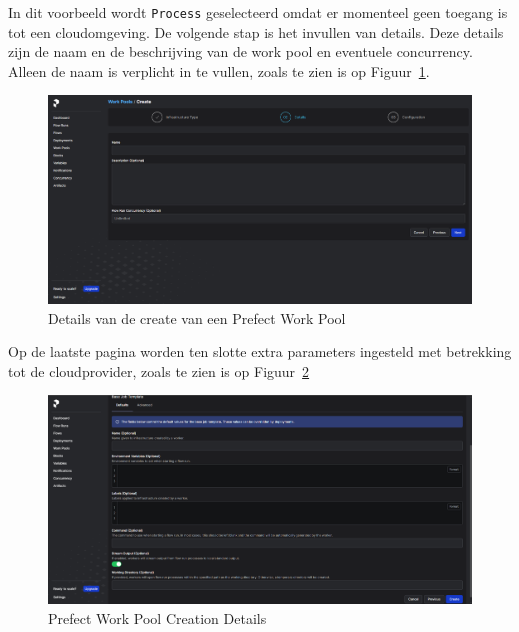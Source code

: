 In dit voorbeeld wordt \texttt{Process} geselecteerd omdat er momenteel geen toegang is tot een cloudomgeving. De volgende stap is het invullen van details. Deze details zijn de naam en de beschrijving van de work pool en eventuele concurrency. Alleen de naam is verplicht in te vullen, zoals te zien is op Figuur~\ref{fig:Prefect_Work_Pools_Create_Details}.

\begin{figure}
    \centering
    \includegraphics[width=0.9\linewidth]{graphics/Prefect_Work_Pools_Create_Details.PNG}
    \caption{Details van de create van een Prefect Work Pool}
    \label{fig:Prefect_Work_Pools_Create_Details}
\end{figure}

Op de laatste pagina worden ten slotte extra parameters ingesteld met betrekking tot de cloudprovider, zoals te zien is op Figuur~\ref{fig:Prefect_Work_Pools_Create_parameters}

\begin{figure}
    \centering
    \includegraphics[width=0.9\linewidth]{graphics/Prefect_Work_Pools_Create_Parameters.PNG}
    \caption{Prefect Work Pool Creation Details}
    \label{fig:Prefect_Work_Pools_Create_parameters}
\end{figure}